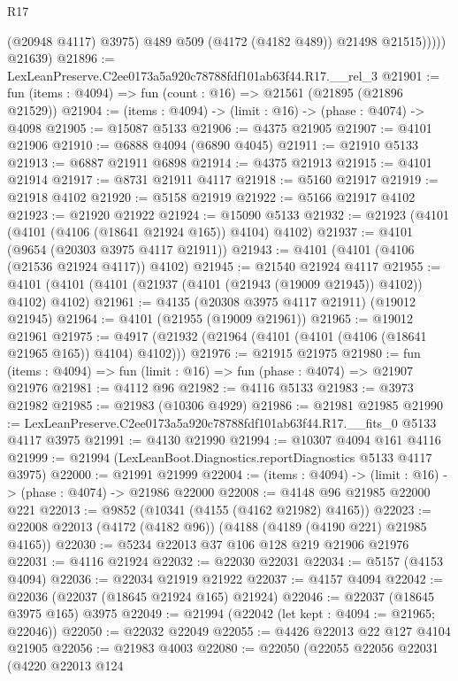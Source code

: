 \begin{lexlean}{R17}
\begin{coremodule}
                  (@20948 @4117)
                  @3975)
                @489
                @509
                (@4172 (@4182 @489))
                @21498
                @21515)))))
      @21639)
@21896 := LexLeanPreserve.C2ee0173a5a920c78788fdf101ab63f44.R17.__rel_3
@21901 := fun (items : @4094) => fun (count : @16) => @21561 (@21895 (@21896 @21529))
@21904 := (items : @4094) -> (limit : @16) -> (phase : @4074) -> @4098
@21905 := @15087 @5133
@21906 := @4375 @21905
@21907 := @4101 @21906
@21910 := @6888 @4094 (@6890 @4045)
@21911 := @21910 @5133
@21913 := @6887 @21911 @6898
@21914 := @4375 @21913
@21915 := @4101 @21914
@21917 := @8731 @21911 @4117
@21918 := @5160 @21917
@21919 := @21918 @4102
@21920 := @5158 @21919
@21922 := @5166 @21917 @4102
@21923 := @21920 @21922
@21924 := @15090 @5133
@21932 := @21923 (@4101 (@4101 (@4106 (@18641 @21924 @165)) @4104) @4102)
@21937 := @4101 (@9654 (@20303 @3975 @4117 @21911))
@21943 := @4101 (@4101 (@4106 (@21536 @21924 @4117)) @4102)
@21945 := @21540 @21924 @4117
@21955 := @4101 (@4101 (@4101 (@21937 (@4101 (@21943 (@19009 @21945)) @4102)) @4102) @4102)
@21961 := @4135 (@20308 @3975 @4117 @21911) (@19012 @21945)
@21964 := @4101 (@21955 (@19009 @21961))
@21965 := @19012 @21961
@21975 := @4917 (@21932 (@21964 (@4101 (@4101 (@4106 (@18641 @21965 @165)) @4104) @4102)))
@21976 := @21915 @21975
@21980 := fun (items : @4094) => fun (limit : @16) => fun (phase : @4074) => @21907 @21976
@21981 := @4112 @96
@21982 := @4116 @5133
@21983 := @3973 @21982
@21985 := @21983 (@10306 @4929)
@21986 := @21981 @21985
@21990 := LexLeanPreserve.C2ee0173a5a920c78788fdf101ab63f44.R17.__fits_0 @5133 @4117 @3975
@21991 := @4130 @21990
@21994 := @10307 @4094 @161 @4116
@21999 := @21994 (LexLeanBoot.Diagnostics.reportDiagnostics @5133 @4117 @3975)
@22000 := @21991 @21999
@22004 := (items : @4094) -> (limit : @16) -> (phase : @4074) -> @21986 @22000
@22008 := @4148 @96 @21985 @22000 @221
@22013 := @9852 (@10341 (@4155 (@4162 @21982) @4165))
@22023 := @22008 @22013 (@4172 (@4182 @96)) (@4188 (@4189 (@4190 @221) @21985 @4165))
@22030 := @5234 @22013 @37 @106 @128 @219 @21906 @21976
@22031 := @4116 @21924
@22032 := @22030 @22031
@22034 := @5157 (@4153 @4094)
@22036 := @22034 @21919 @21922
@22037 := @4157 @4094
@22042 := @22036 (@22037 (@18645 @21924 @165) @21924)
@22046 := @22037 (@18645 @3975 @165) @3975
@22049 := @21994 (@22042 (let kept : @4094 := @21965; @22046))
@22050 := @22032 @22049
@22055 := @4426 @22013 @22 @127 @4104 @21905
@22056 := @21983 @4003
@22080 := @22050
    (@22055
      @22056
      @22031
      (@4220
        @22013
        @124

\end{coremodule}
\end{lexlean}
